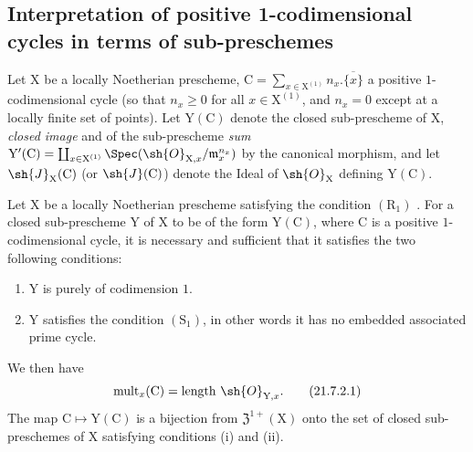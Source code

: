 \subsection{Interpretation of positive 1-codimensional cycles in terms of sub-preschemes}
\label{subsection:IV.21.7}
\label{IV.21.7}

\begin{env}[21.7.1]
\label{IV.21.7.1}
Let $\mathrm{X}$ be a locally Noetherian prescheme, $\mathrm{C}=\sum_{x\in\mathrm{X}^{(1)}}n_x.\overline{\{x\}}$ a positive $1$-codimensional cycle (so that $n_x\geq 0$ for all $x\in\mathrm{X}^{(1)}$, and $n_x=0$ except at a locally finite set of points).
Let $\mathrm{Y}(\mathrm{C})$ denote the closed sub-prescheme of $\mathrm{X}$, \emph{closed image}  and  of the sub-prescheme \emph{sum} $\mathrm{Y}'(\mathrm{C})=\coprod_{x\in\mathrm{X}^{(1)}}\Spec(\sh{O}_{\mathrm{X},x}/\mathfrak{m}_x^{n_x})$ by the canonical morphism, and let $\sh{J}_\mathrm{X}(\mathrm{C})$ (or $\sh{J}(\mathrm{C})$) denote the Ideal of $\sh{O}_\mathrm{X}$ defining $\mathrm{Y}(\mathrm{C})$.
\end{env}

\begin{proposition}[21.7.2]
\label{IV.21.7.2}
Let $\mathrm{X}$ be a locally Noetherian prescheme satisfying the condition $(\mathrm{R}_1)$ .
For a closed sub-prescheme $\mathrm{Y}$ of $\mathrm{X}$ to be of the form $\mathrm{Y}(\mathrm{C})$, where $\mathrm{C}$ is a positive $1$-codimensional cycle, it is necessary and sufficient that it satisfies the two following conditions:
\begin{enumerate}[label=(\roman*)]
  \item $\mathrm{Y}$ is purely of codimension $1$.
  \item $\mathrm{Y}$ satisfies the condition $(\mathrm{S}_1)$, in other words  it has no embedded associated prime cycle.
\end{enumerate}
We then have
\[
\label{IV.21.7.2.1}
  \operatorname{mult}_x(\mathrm{C})=\operatorname{length}\,\sh{O}_{\mathrm{Y},x}.
  \tag{21.7.2.1}
\]
The map $\mathrm{C}\mapsto\mathrm{Y}(\mathrm{C})$ is a bijection from $\mathfrak{Z}^{1+}(\mathrm{X})$ onto the set of closed sub-preschemes of $\mathrm{X}$ satisfying conditions (i) and (ii).
\end{proposition}

